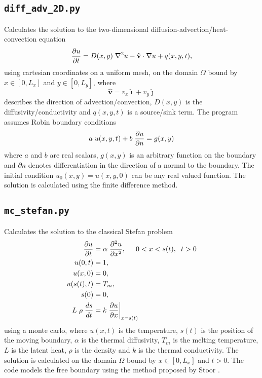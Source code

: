 \documentclass{article}
\begin{document}
\subsection{\texttt{diff\_adv\_2D.py}} 

Calculates the solution to the two-dimensional diffusion-advection/heat-convection equation
\begin{equation*}
\frac{\partial u}{\partial t} = D(x,y) \hspace{0.1cm} \nabla^{2} u  - \mathbf{\hat{v}} \cdot \nabla u + q(x,y,t),
\end{equation*}
using cartesian coordinates on a uniform mesh, on the domain $\Omega$ bound by $x \in [0,L_x]$ and $y \in [0,L_y]$, where
\begin{equation*}
\mathbf{\hat{v}} = v_x \mathbf{\hat{\imath}} + v_y \mathbf{\hat{\jmath}}
\end{equation*}
describes the direction of advection/convection, $D(x,y)$ is the diffusivity/conductivity and $q(x,y,t)$ is a source/sink term. The program assumes Robin boundary conditions
\begin{equation*}
a \hspace{0.1cm} u(x,y,t) + b \hspace{0.1cm} \frac{\partial u}{\partial n} = g(x,y)
\end{equation*}
where $a$ and $b$ are real scalars, $g(x,y)$ is an arbitrary function on the boundary and $\partial n$ denotes differentiation in the direction of a normal to the boundary. The initial condition $u_0(x,y)=u(x,y,0)$ can be any real valued function. The solution is calculated using the finite difference method.

\subsection{\texttt{mc\_stefan.py}}
Calculates the solution to the classical Stefan problem
\begin{align*}
\frac{\partial u}{\partial t} &= \alpha \hspace{0.1cm} \frac{\partial^2 u}{\partial x^2}, \hspace{0.5cm} 0 < x < s(t), \hspace{0.2cm} t > 0 \\
u(0,t)&=1,\\
u(x,0)&=0,\\
u(s(t),t)&=T_m,\\
s(0)&=0,\\
L \hspace{0.1cm} \rho \hspace{0.1cm} \frac{ds}{dt} &= k \hspace{0.1cm} \frac{\partial u}{\partial x}\bigg|_{x=s(t)}
\end{align*}
using a monte carlo, where $u(x,t)$ is the temperature, $s(t)$ is the position of the moving boundary, $\alpha$ is the thermal diffusivity, $T_m$ is the melting temperature, $L$ is the latent heat, $\rho$ is the density and $k$ is the thermal conductivity. The solution is calculated on the domain $\Omega$ bound by $x \in [0,L_x]$ and $t > 0$. The code models the free boundary using the method proposed by Stoor \cite{stoor}. 
\newline 
\end{document}
